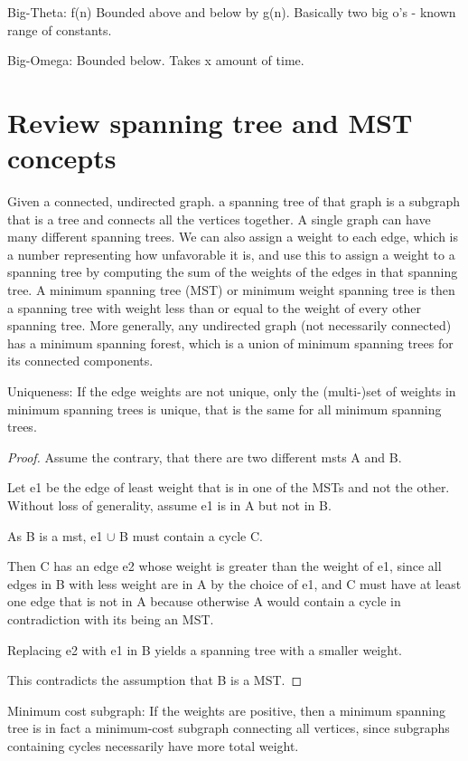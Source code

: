 \documentclass[10 pt]{article}
\begin{document}
Big-Theta: f(n) Bounded above and below by g(n). Basically two big o's - known range of constants.

Big-Omega: Bounded below. Takes x amount of time.


\section{Review spanning tree and MST concepts}
Given a connected, undirected graph. a spanning tree of that graph is a subgraph that is a tree and connects all the vertices together. A single graph can have many different spanning trees. We can also assign a weight to each edge, which is a number representing how unfavorable it is, and use this to assign a weight to a spanning tree by computing the sum of the weights of the edges in that spanning tree. A minimum spanning tree (MST) or minimum weight spanning tree is then a spanning tree with weight less than or equal to the weight of every other spanning tree. More generally, any undirected graph (not necessarily connected) has a minimum spanning forest, which is a union of minimum spanning trees for its connected components.

Uniqueness: If the edge weights are not unique, only the (multi-)set of weights in minimum spanning trees is unique, that is the same for all minimum spanning trees.

\begin{proof}
\item Assume the contrary, that there are two different msts A and B.
\item Let e1 be the edge of least weight that is in one of the MSTs and not the other. Without loss of generality, assume e1 is in A but not in B.
\item As B is a mst, e1 $\cup$ B must contain a cycle C.
\item Then C has an edge e2 whose weight is greater than the weight of e1, since all edges in B with less weight are in A by the choice of e1, and C must have at least one edge that is not in A because otherwise A would contain a cycle in contradiction with its being an MST.
\item Replacing e2 with e1 in B yields a spanning tree with a smaller weight.
\item This contradicts the assumption that B is a MST.
\end{proof}

Minimum cost subgraph: If the weights are positive, then a minimum spanning tree is in fact a minimum-cost subgraph connecting all vertices, since subgraphs containing cycles necessarily have more total weight.
\end{document}
